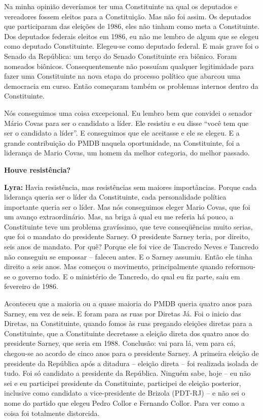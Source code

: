 Na minha opinião deveríamos ter uma Constituinte na qual os deputados e
vereadores fossem eleitos para a Constituição. Mas não foi assim. Os
deputados que participaram das eleições de 1986, eles não tinham como
meta a Constituinte. Dos deputados federais eleitos em 1986, eu não me
lembro de algum que se elegeu como deputado Constituinte. Elegeu-se como
deputado federal. E mais grave foi o Senado da República: um terço do
Senado Constituinte era biônico. Foram nomeados biônicos.
Consequentemente não possuíam qualquer legitimidade para fazer uma
Constituinte na nova etapa do processo político que abarcou uma
democracia em curso. Então começaram também os problemas internos dentro
da Constituinte.

Nós conseguimos uma coisa excepcional. Eu lembro bem que convidei o
senador Mário Covas para ser o candidato a líder. Ele resistiu e eu
disse ``você tem que ser o candidato a líder''. E conseguimos que ele
aceitasse e ele se elegeu. E a grande contribuição do PMDB naquela
oportunidade, na Constituinte, foi a liderança de Mario Covas, um homem
da melhor categoria, do melhor passado.

\textbf{Houve resistência?}

\textbf{Lyra:} Havia resistência, mas resistências sem maiores
importâncias. Porque cada liderança queria ser o líder da Constituinte,
cada personalidade política importante queria ser o líder. Mas nós
conseguimos eleger Mario Covas, que foi um avanço extraordinário. Mas,
na briga à qual eu me referia há pouco, a Constituinte teve um problema
gravíssimo, que teve conseqüências muito serias, que foi o mandato do
presidente Sarney. O presidente Sarney teria, por direito, seis anos de
mandato. Por quê? Porque ele foi vice de Tancredo Neves e Tancredo não
conseguiu se empossar -- faleceu antes. E o Sarney assumiu. Então ele
tinha direito a seis anos. Mas começou o movimento, principalmente
quando reformou-se o governo todo. E o ministério de Tancredo, do qual
eu fiz parte, saiu em fevereiro de 1986.

Aconteceu que a maioria ou a quase maioria do PMDB queria quatro anos
para Sarney, em vez de seis. E foram para as ruas por Diretas Já. Foi o
inicio das Diretas, na Constituinte, quando fomos às ruas pregando
eleições diretas para a Constituinte, que a Constituinte decretasse a
eleição direta dos quatro anos do presidente Sarney, que seria em 1988.
Conclusão: vai para lá, vem para cá, chegou-se ao acordo de cinco anos
para o presidente Sarney. A primeira eleição de presidente da República
após a ditadura -- eleição direta -- foi realizada isolada de tudo. Foi
só candidato a presidente da República. Ninguém sabe, hoje -- eu não sei
e eu participei presidente da Constituinte, participei de eleição
posterior, inclusive como candidato a vice-presidente de Brizola
(PDT-RJ) -- e não sei o nome do partido que elegeu Pedro Collor e
Fernando Collor. Para ver como a coisa foi totalmente distorcida.

